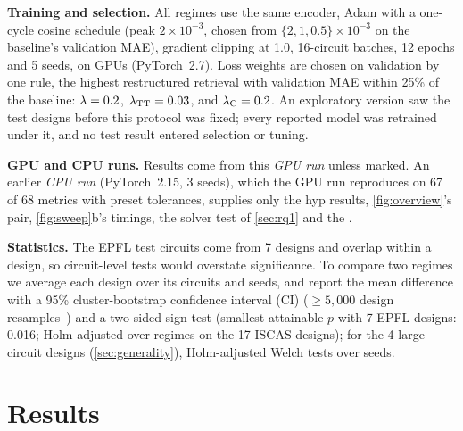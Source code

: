 \noindent\textbf{Training and selection.} All regimes use the same encoder, Adam with a one-cycle cosine
schedule (peak $2\!\times\!10^{-3}$, chosen from $\{2,1,0.5\}\!\times\!10^{-3}$ on the baseline's validation MAE), gradient clipping
at 1.0, 16-circuit batches, 12 epochs and 5 seeds, on GPUs (PyTorch~2.7).
Loss weights are chosen on validation by one rule, the highest restructured retrieval with validation MAE within
25\% of the baseline: $\lambda=0.2$, $\lambda_{\mathrm{TT}}=0.03$, and $\lambda_{\mathrm C}=0.2$. An exploratory version saw the test designs before this protocol was fixed; every reported model was retrained under it, and
no test result entered selection or tuning.

\noindent\textbf{GPU and CPU runs.} Results come from this \emph{GPU run} unless marked. An earlier \emph{CPU run}
(PyTorch~2.15, 3 seeds), which the GPU run reproduces on 67 of 68 metrics with preset tolerances, supplies only the
hyp results, \cref{fig:overview}'s pair, \cref{fig:sweep}b's timings, the solver test of \cref{sec:rq1} and the .

\noindent\textbf{Statistics.} The EPFL test circuits come from 7 designs and overlap within a design,
so circuit-level tests would overstate significance. To compare two regimes we average each design over its
circuits and seeds, and report the mean difference with a 95\% cluster-bootstrap confidence interval (CI)
(${\ge}5{,}000$ design resamples~\cite{DBLP:books/sp/EfronT93}) and a two-sided sign test (smallest attainable $p$ with 7 EPFL
designs: 0.016; Holm-adjusted over regimes on the 17 ISCAS designs); for the 4 large-circuit designs (\cref{sec:generality}),
Holm-adjusted Welch tests over seeds.

\section{Results}\label{sec:results}


